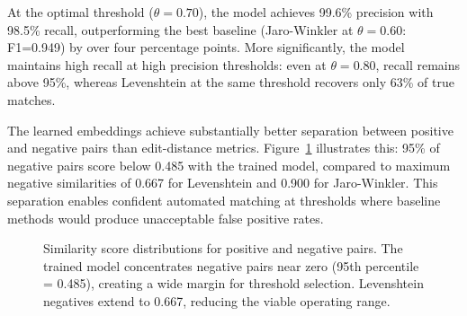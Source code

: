 \documentclass[11pt]{article}
\begin{document}
    At the optimal threshold ($\theta=0.70$), the model achieves 99.6\% precision with
    98.5\% recall, outperforming the best baseline (Jaro-Winkler at $\theta=0.60$:
    F1=0.949) by over four percentage points. More significantly, the model maintains
    high recall at high precision thresholds: even at $\theta=0.80$, recall remains
    above 95\%, whereas Levenshtein at the same threshold recovers only 63\% of true
    matches.

    The learned embeddings achieve substantially better separation between positive
    and negative pairs than edit-distance metrics. Figure~\ref{fig:distribution}
    illustrates this: 95\% of negative pairs score below 0.485 with the trained model,
    compared to maximum negative similarities of 0.667 for Levenshtein and 0.900 for
    Jaro-Winkler. This separation enables confident automated matching at thresholds
    where baseline methods would produce unacceptable false positive rates.

    \begin{figure}[h]
        \centering
        \caption{Similarity score distributions for positive and negative pairs. The
        trained model concentrates negative pairs near zero (95th percentile = 0.485),
            creating a wide margin for threshold selection. Levenshtein negatives extend
            to 0.667, reducing the viable operating range.}
        \label{fig:distribution}
    \end{figure}
\end{document}
